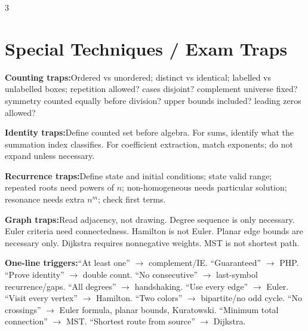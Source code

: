 \documentclass[10pt]{article}
\newenvironment{cheatitems}{\par\vspace{-1pt}}{\par\vspace{-1pt}}
\newcommand{\cheatrow}[2]{\par\noindent\textbf{#1:}\enspace #2\par}
\begin{document}
\begin{multicols}{3}
\section*{Special Techniques / Exam Traps}
\begin{cheatitems}
\cheatrow{Counting traps}{Ordered vs unordered; distinct vs identical; labelled vs unlabelled boxes; repetition allowed? cases disjoint? complement universe fixed? symmetry counted equally before division? upper bounds included? leading zeros allowed?}
\cheatrow{Identity traps}{Define counted set before algebra. For sums, identify what the summation index classifies. For coefficient extraction, match exponents; do not expand unless necessary.}
\cheatrow{Recurrence traps}{Define state and initial conditions; state valid range; repeated roots need powers of $n$; non-homogeneous needs particular solution; resonance needs extra $n^m$; check first terms.}
\cheatrow{Graph traps}{Read adjacency, not drawing. Degree sequence is only necessary. Euler criteria need connectedness. Hamilton is not Euler. Planar edge bounds are necessary only. Dijkstra requires nonnegative weights. MST is not shortest path.}
\cheatrow{One-line triggers}{``At least one'' $\to$ complement/IE. ``Guaranteed'' $\to$ PHP. ``Prove identity'' $\to$ double count. ``No consecutive'' $\to$ last-symbol recurrence/gaps. ``All degrees'' $\to$ handshaking. ``Use every edge'' $\to$ Euler. ``Visit every vertex'' $\to$ Hamilton. ``Two colors'' $\to$ bipartite/no odd cycle. ``No crossings'' $\to$ Euler formula, planar bounds, Kuratowski. ``Minimum total connection'' $\to$ MST. ``Shortest route from source'' $\to$ Dijkstra.}
\end{cheatitems}

\end{multicols}
\end{document}
